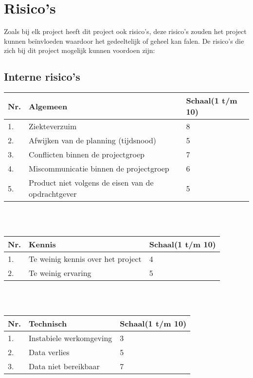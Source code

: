 \chapter{Risico's} \label{cha:risicos}

Zoals bij elk project heeft dit project ook risico’s, deze risico’s zouden het project kunnen beïnvloeden waardoor het gedeeltelijk of geheel kan falen. De risico’s die zich bij dit project mogelijk kunnen voordoen zijn:

\section{Interne risico's} \label{sec:Interne risicos}


\begin{left}
    \begin{tabular}{ | l | l | l | }
    	\hline
    	Nr. & Algemeen & Schaal(1 t/m 10) \\ \hline
    	1.	& Ziekteverzuim & 8 \\ \hline
    	2.  & Afwijken van de planning (tijdsnood) & 5 \\ \hline
    	3.  & Conflicten binnen de projectgroep & 7 \\ \hline
    	4.  & Miscommunicatie binnen de projectgroep & 6 \\ \hline
    	5.  & Product niet volgens de eisen van de opdrachtgever & 5 \\ \hline
  	\end{tabular}
\end{left}
\\
\\
\begin{left}
    \begin{tabular}{ | l | l | l | }
    	\hline
    	Nr. & Kennis & Schaal(1 t/m 10) \\ \hline
    	1.	& Te weinig kennis over het project & 4 \\ \hline
    	2.  & Te weinig ervaring & 5 \\ \hline
  	\end{tabular}
\end{left}
\\
\\
\begin{left}
    \begin{tabular}{ | l | l | l | }
    	\hline
    	Nr. & Technisch & Schaal(1 t/m 10) \\ \hline
    	1.	& Instabiele werkomgeving & 3 \\ \hline
    	2.  & Data verlies & 5 \\ \hline
    	3.  & Data niet bereikbaar & 7 \\ \hline
  	\end{tabular}
\end{left}

